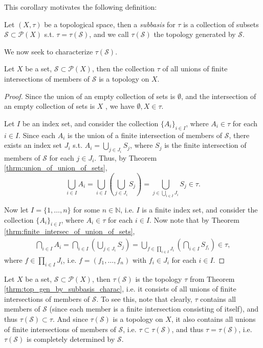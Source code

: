 This corollary motivates the following definition:

\begin{defn}
	Let $(X, \tau)$ be a topological space, then a \textit{subbasis} for $\tau$ is a collection of subsets $\mathscr S\subset \mathscr P(X)$ s.t. $\tau = \tau(\mathscr S)$, and we call $\tau(\mathscr S)$ the topology generated by $\mathscr S$.
\end{defn}

We now seek to characterize $\tau(\mathscr S)$. 

\begin{theorem}\label{thrm:top_gen_by_subbasis_charac}
	Let $X$ be a set, $\mathscr S\subset \mathscr P(X)$, then the collection $\tau$ of all unions of finite intersections of members of $\mathscr S$ is a topology on $X$.
\end{theorem}

\begin{proof}
	Since the union of an empty collection of sets is $\emptyset$, and the intersection of an empty collection of sets is $X$ \cite{370201}, we have $\emptyset, X\in\tau$. 
	
	Let $I$ be an index set, and consider the collection $\{ A_i \}_{i\in I}$, where $A_i\in\tau$ for each $i\in I$. Since each $A_i$ is the union of a finite intersection of members of $\mathscr S$, there exists an index set $J_i$ s.t. $A_i = \bigcup_{j\in J_i}S_{j}$, where $S_j$ is the finite intersection of members of $\mathscr S$ for each $j\in J_i$. Thus, by Theorem \ref{thrm:union_of_union_of_sets}, 
	$$\bigcup_{i\in I}A_i = \bigcup_{i\in I}\left(\bigcup_{j\in J_i}{S_j}\right) = \bigcup_{j\in \bigcup_{i\in I}J_i}S_j\in \tau.$$
	
	Now let $I = \{1, \dots, n\}$ for some $n\in\mathbb N$, i.e. $I$ is a finite index set, and consider the collection $\{A_i\}_{i\in I}$, where $A_i\in\tau$ for each $i\in I$. Now note that by Theorem \ref{thrm:finite_intersec_of_union_of_sets},
	\begin{align}\label{eq:finite_intersec_arbitrary_unions}
		\bigcap_{i\in I}A_i = \bigcap_{i\in I}\left(\bigcup_{j\in J_i}S_j\right) = \bigcup_{f\in \prod_{i\in I} J_i}\left(\bigcap_{i\in I}S_{f_i}\right)\in\tau,
	\end{align}
	where $f\in\prod_{i\in I}J_i$, i.e. $f = (f_1, \dots, f_n)$ with $f_i\in J_i$ for each $i\in I$.
\end{proof}

\begin{remark}
	Let $X$ be a set, $\mathscr S\subset \mathscr P(X)$, then $\tau(\mathscr S)$ is the topology $\tau$ from Theorem \ref{thrm:top_gen_by_subbasis_charac}, i.e. it consists of all unions of finite intersections of members of $\mathscr S$. To see this, note that clearly, $\tau$ contains all members of $\mathscr S$ (since each member is a finite intersection consisting of itself), and thus $\tau(\mathscr S)\subset \tau$. And since $\tau(\mathscr S)$ is a topology on $X$, it also contains all unions of finite intersections of members of $\mathscr S$, i.e. $\tau\subset \tau(\mathscr S)$, and thus $\tau = \tau(\mathscr S)$, i.e. $\tau(\mathscr S)$ is completely determined by $\mathscr S$.
\end{remark}

